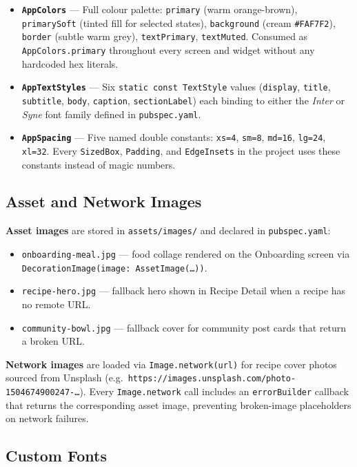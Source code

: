 \documentclass[11pt,a4paper]{article}
\begin{document}
\begin{itemize}
  \item \textbf{\texttt{AppColors}} — Full colour palette: \texttt{primary} (warm orange-brown), \texttt{primarySoft} (tinted fill for selected states), \texttt{background} (cream \texttt{\#FAF7F2}), \texttt{border} (subtle warm grey), \texttt{textPrimary}, \texttt{textMuted}. Consumed as \texttt{AppColors.primary} throughout every screen and widget without any hardcoded hex literals.
  \item \textbf{\texttt{AppTextStyles}} — Six \texttt{static const TextStyle} values (\texttt{display}, \texttt{title}, \texttt{subtitle}, \texttt{body}, \texttt{caption}, \texttt{sectionLabel}) each binding to either the \emph{Inter} or \emph{Syne} font family defined in \texttt{pubspec.yaml}.
  \item \textbf{\texttt{AppSpacing}} — Five named double constants: \texttt{xs=4}, \texttt{sm=8}, \texttt{md=16}, \texttt{lg=24}, \texttt{xl=32}. Every \texttt{SizedBox}, \texttt{Padding}, and \texttt{EdgeInsets} in the project uses these constants instead of magic numbers.
\end{itemize}

\subsection{Asset and Network Images}

\textbf{Asset images} are stored in \texttt{assets/images/} and declared in \texttt{pubspec.yaml}:
\begin{itemize}
  \item \texttt{onboarding-meal.jpg} — food collage rendered on the Onboarding screen via \texttt{DecorationImage(image: AssetImage(\ldots))}.
  \item \texttt{recipe-hero.jpg} — fallback hero shown in Recipe Detail when a recipe has no remote URL.
  \item \texttt{community-bowl.jpg} — fallback cover for community post cards that return a broken URL.
\end{itemize}

\textbf{Network images} are loaded via \texttt{Image.network(url)} for recipe cover photos sourced from Unsplash (e.g.\ \texttt{https://images.unsplash.com/photo-1504674900247-\ldots}). Every \texttt{Image.network} call includes an \texttt{errorBuilder} callback that returns the corresponding asset image, preventing broken-image placeholders on network failures.

\subsection{Custom Fonts}
\end{document}
